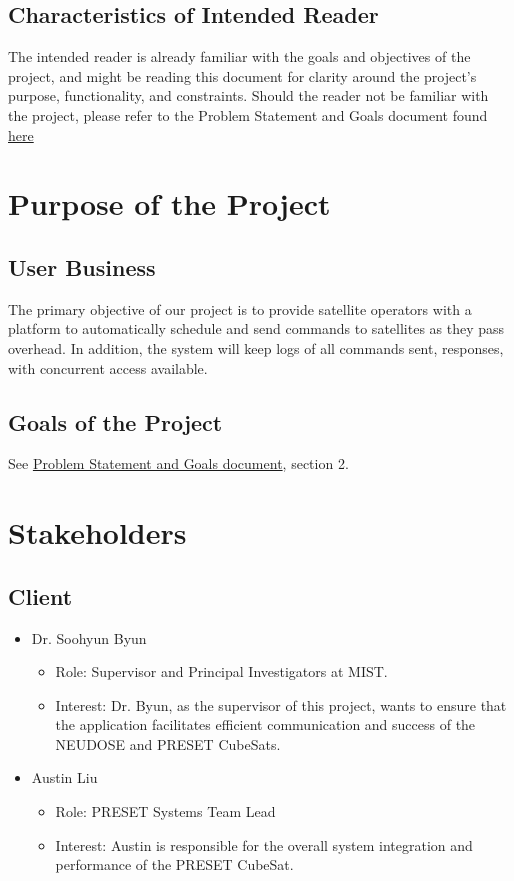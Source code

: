 \documentclass[12pt]{article}
\begin{document}
\subsection{Characteristics of Intended Reader}
The intended reader is already familiar with the goals and objectives of the project, and might be reading this document for clarity around the project’s purpose, functionality, and constraints. Should the reader not be familiar with the project, please refer to the Problem Statement and Goals document found \href{https://github.com/RishiVaya/Lower_Earth_Orbiters/blob/main/docs/ProblemStatementAndGoals/ProblemStatement.pdf}{here} 

\section{Purpose of the Project}
\subsection{User Business}
The primary objective of our project is to provide satellite operators with a platform to automatically schedule and send commands to satellites as they pass overhead. In addition, the system will keep logs of all commands sent, responses, with concurrent access available. 
\subsection{Goals of the Project}
See \href{https://github.com/RishiVaya/Lower_Earth_Orbiters/blob/main/docs/ProblemStatementAndGoals/ProblemStatement.pdf}{ Problem Statement and Goals document}, section 2.
\section{Stakeholders}
\subsection{Client}
\begin{itemize}
    \item Dr. Soohyun Byun
    \begin{itemize}
        \item Role: Supervisor and Principal Investigators at MIST.
        \item Interest: Dr. Byun, as the supervisor of this project, wants to ensure that the application facilitates efficient communication and success of the NEUDOSE and PRESET CubeSats.

        
    \end{itemize}

    \item Austin Liu
    \begin{itemize}
        \item Role: PRESET Systems Team Lead
        \item Interest: Austin is responsible for the overall system integration and performance of the PRESET CubeSat.

    \end{itemize}
\end{itemize}
\end{document}
